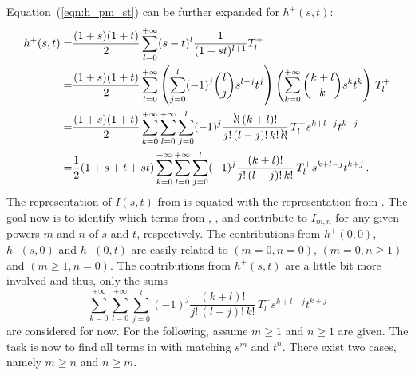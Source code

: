 Equation~(\ref{eqn:h_pm_st}) can be further expanded for $h^{+}(s,t)$:
\begin{align}
 h^{+}(s,t)
 =& \frac{(1+s)(1+t)}{2}
    \sum\limits_{l=0}^{+\infty} (s-t)^l \frac{1}{(1-st)^{l+1}} T^{+}_l \nonumber \\
 =& \frac{(1+s)(1+t)}{2}
    \sum\limits_{l=0}^{+\infty}
      \left( \sum\limits_{j=0}^{l} (-1)^{j} {\genfrac(){0pt}{0}{l}{j}} s^{l-j} t^{j} \right)
      \left( \sum\limits_{k=0}^{+\infty} {\genfrac(){0pt}{0}{k+l}{k}} s^k t^k \right)
      \,T^{+}_l \nonumber \\
 =& \frac{(1+s)(1+t)}{2}
    \sum\limits_{k=0}^{+\infty}
    \sum\limits_{l=0}^{+\infty}
    \sum\limits_{j=0}^{l}
      (-1)^{j}
      \frac{\bcancel{l!}\,(k+l)!}{j!\,(l-j)!\,k!\,\bcancel{l!}}
      \,T^{+}_l
      s^{k+l-j} t^{k+j} \nonumber \\
 =& \frac{1}{2} (1+s+t+st)
    \sum\limits_{k=0}^{+\infty}
    \sum\limits_{l=0}^{+\infty}
    \sum\limits_{j=0}^{l}
      (-1)^{j}
      \frac{(k+l)!}{j!\,(l-j)!\,k!}
      \,T^{+}_l
      s^{k+l-j} t^{k+j} \label{eqn:h_p_st} \, .
\end{align}
The representation of $I(s,t)$ from  is equated with the representation from .
The goal now is to identify which terms from , ,  and 
contribute to $I_{m,n}$ for any given powers $m$ and $n$ of $s$ and $t$, respectively.
The contributions from $h^{+}(0,0)$, $h^{-}(s,0)$ and $h^{-}(0,t)$ are easily related to $(m=0, n=0)$, $(m=0, n\geq1)$ and $(m\geq1, n=0)$.
The contributions from $h^{+}(s,t)$ are a little bit more involved
and thus, only the sums
\begin{equation}
  \sum\limits_{k=0}^{+\infty}
  \sum\limits_{l=0}^{+\infty}
  \sum\limits_{j=0}^{l}
    (-1)^{j}
    \frac{(k+l)!}{j!\,(l-j)!\,k!}
    \,T^{+}_l
    s^{k+l-j} t^{k+j} \label{eqn:sums_h_p_st}
\end{equation}
are considered for now.
For the following, assume $m\geq1$ and $n\geq1$ are given. The task is now to find all terms in  with matching $s^m$ and $t^n$.
There exist two cases, namely $m \geq n$ and $n \geq m$.

